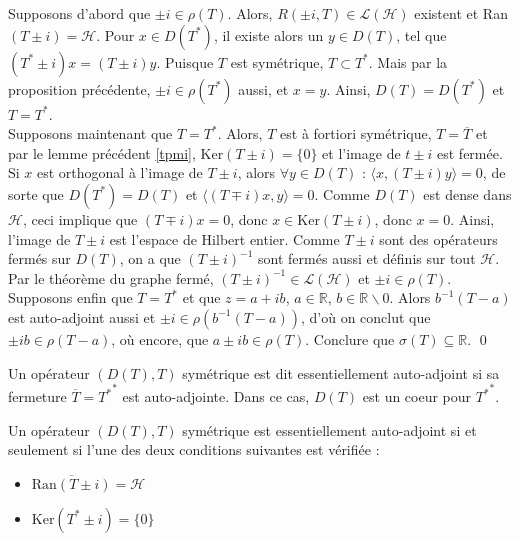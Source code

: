 \begin{Pre}
Supposons d'abord que $\pm i\in \rho(T)$. Alors, $R(\pm i,T)\in \mathcal L(\mathcal H)$ existent et Ran$(T\pm i)=\mathcal H$. Pour $x\in D(T^*)$, il existe alors un $y\in D(T)$, tel que $(T^*\pm i)x=(T\pm i)y$. Puisque $T$ est symétrique, $T\subset T^*$. Mais par la proposition précédente, $\pm i\in \rho(T^*)$ aussi, et $x=y$. Ainsi, $D(T)=D(T^*)$ et $T=T^*$.\\
Supposons maintenant que $T=T^*$. Alors, $T$ est à fortiori symétrique, $T=\overline T$ et par le lemme précédent \ref{tpmi}, Ker$(T\pm i)=\{0\}$ et l'image de $t\pm i$ est fermée. Si $x$ est orthogonal à l'image de $T\pm i$, alors $\forall y\in D(T)$ : $\langle x, (T\pm i)y\rangle =0$, de sorte que $D(T^*)=D(T)$ et $\langle (T\mp i)x, y\rangle =0$. Comme $D(T)$ est dense dans $\mathcal H$, ceci implique que $(T\mp i)x=0$, donc $x\in \text{Ker}(T\pm i)$, donc $x=0$. Ainsi, l'image de $T\pm i$ est l'espace de Hilbert entier. Comme $T\pm i$ sont des opérateurs fermés sur $D(T)$, on a que $(T\pm i)^{-1}$ sont fermés aussi et définis sur tout $\mathcal H$. Par le théorème du graphe fermé, $(T\pm i)^{-1}\in\mathcal L(\mathcal H)$ et $\pm i\in \rho(T)$.\\
Supposons enfin que $T=T^*$ et que $z=a+ib$, $a\in\mathbb R$, $b\in\mathbb R\backslash{0}$. Alors $b^{-1}(T-a)$ est auto-adjoint aussi et $\pm i\in \rho(b^{-1}(T-a))$, d'où on conclut que $\pm ib\in\rho(T-a)$, où encore, que $a\pm ib\in \rho(T)$. Conclure que $\sigma(T)\subseteq \mathbb R$.
\qed\end{Pre}

\begin{Def}
Un opérateur $(D(T),T)$ symétrique est dit essentiellement auto-adjoint si sa fermeture $\overline T={T^*}^*$ est auto-adjointe. Dans ce cas, $D(T)$ est un coeur pour ${T^*}^*$.
\end{Def}

\begin{Cor} Un opérateur $(D(T),T)$ symétrique est essentiellement auto-adjoint si et seulement si l'une des deux conditions suivantes est vérifiée :
\begin{itemize}
\item $\overline{\text{Ran}(T\pm i)}=\mathcal H$
\item $\text{Ker}(T^*\pm i)=\{0\}$
\end{itemize}
\end{Cor}

